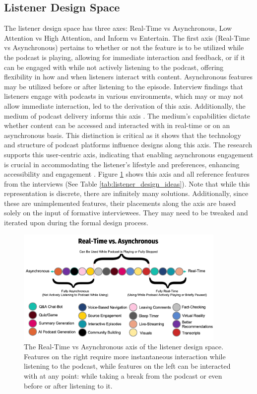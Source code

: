 \documentclass[12pt]{report}
\begin{document}
\begin{myfont}
        \subsection{Listener Design Space}
        The listener design space has three axes: Real-Time vs Asynchronous, Low Attention vs High Attention, and Inform vs Entertain. The first axis (Real-Time vs Asynchronous) pertains to whether or not the feature is to be utilized while the podcast is playing, allowing for immediate interaction and feedback, or if it can be engaged with while not actively listening to the podcast, offering flexibility in how and when listeners interact with content. Asynchronous features may be utilized before or after listening to the episode. Interview findings that listeners engage with podcasts in various environments, which may or may not allow immediate interaction, led to the derivation of this axis. Additionally, the medium of podcast delivery informs this axis  \citep{Sundar2010Designing}. The medium's capabilities dictate whether content can be accessed and interacted with in real-time or on an asynchronous basis. This distinction is critical as it shows that the technology and structure of podcast platforms influence designs along this axis. The research supports this user-centric axis, indicating that enabling asynchronous engagement is crucial in accommodating the listener’s lifestyle and preferences, enhancing accessibility and engagement \citep{GarciaMarin2020}. Figure \ref{fig:realtimevsasync} shows this axis and all reference features from the interviews (See Table \ref{tab:listener_design_ideas}). Note that while this representation is discrete, there are infinitely many solutions. Additionally, since these are unimplemented features, their placements along the axis are based solely on the input of formative interviewees. They may need to be tweaked and iterated upon during the formal design process.

        \begin{figure}[H]
        \centering
          \includegraphics[width=0.9\textwidth]{figures/realtimevsasync.png}
          \caption{The Real-Time vs Asynchronous axis of the listener design space. Features on the right require more instantaneous interaction while listening to the podcast, while features on the left can be interacted with at any point: while taking a break from the podcast or even before or after listening to it.}
          \label{fig:realtimevsasync}
        \end{figure}
        

\end{myfont}
\end{document}
